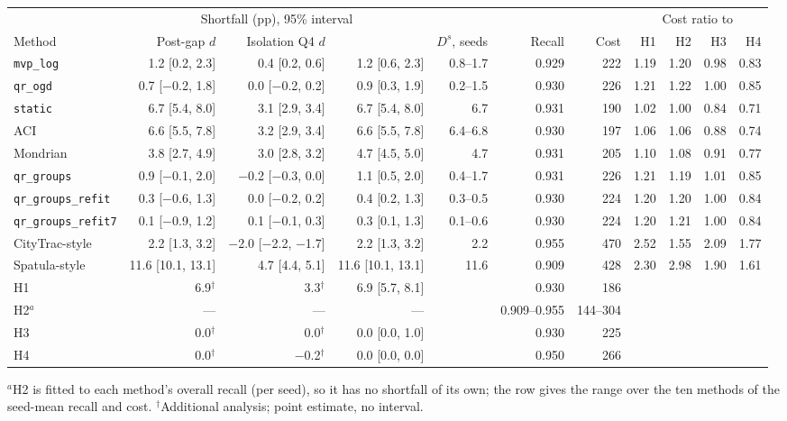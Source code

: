 \begin{tabular}{@{}lrrrrrrrrrr@{}}
\toprule
 & \multicolumn{3}{c}{Shortfall (pp), 95\% interval} & & & & \multicolumn{4}{c}{Cost ratio to} \\
\cmidrule(lr){2-4}\cmidrule(l){8-11}
Method & Post-gap $d$ & Isolation Q4 $d$ & \Dbar{} & $D^s$, seeds & Recall & Cost & H1 & H2 & H3 & H4 \\
\midrule
\texttt{mvp\_log} & 1.2 [0.2, 2.3] & 0.4 [0.2, 0.6] & 1.2 [0.6, 2.3] & 0.8--1.7 & 0.929 & 222 & 1.19 & 1.20 & 0.98 & 0.83 \\
\texttt{qr\_ogd} & 0.7 [$-$0.2, 1.8] & 0.0 [$-$0.2, 0.2] & 0.9 [0.3, 1.9] & 0.2--1.5 & 0.930 & 226 & 1.21 & 1.22 & 1.00 & 0.85 \\
\addlinespace
\texttt{static} & 6.7 [5.4, 8.0] & 3.1 [2.9, 3.4] & 6.7 [5.4, 8.0] & 6.7 & 0.931 & 190 & 1.02 & 1.00 & 0.84 & 0.71 \\
ACI & 6.6 [5.5, 7.8] & 3.2 [2.9, 3.4] & 6.6 [5.5, 7.8] & 6.4--6.8 & 0.930 & 197 & 1.06 & 1.06 & 0.88 & 0.74 \\
Mondrian & 3.8 [2.7, 4.9] & 3.0 [2.8, 3.2] & 4.7 [4.5, 5.0] & 4.7 & 0.931 & 205 & 1.10 & 1.08 & 0.91 & 0.77 \\
\texttt{qr\_groups} & 0.9 [$-$0.1, 2.0] & $-$0.2 [$-$0.3, 0.0] & 1.1 [0.5, 2.0] & 0.4--1.7 & 0.931 & 226 & 1.21 & 1.19 & 1.01 & 0.85 \\
\texttt{qr\_groups\_refit} & 0.3 [$-$0.6, 1.3] & 0.0 [$-$0.2, 0.2] & 0.4 [0.2, 1.3] & 0.3--0.5 & 0.930 & 224 & 1.20 & 1.20 & 1.00 & 0.84 \\
\texttt{qr\_groups\_refit7} & 0.1 [$-$0.9, 1.2] & 0.1 [$-$0.1, 0.3] & 0.3 [0.1, 1.3] & 0.1--0.6 & 0.930 & 224 & 1.20 & 1.21 & 1.00 & 0.84 \\
CityTrac-style & 2.2 [1.3, 3.2] & $-$2.0 [$-$2.2, $-$1.7] & 2.2 [1.3, 3.2] & 2.2 & 0.955 & 470 & 2.52 & 1.55 & 2.09 & 1.77 \\
Spatula-style & 11.6 [10.1, 13.1] & 4.7 [4.4, 5.1] & 11.6 [10.1, 13.1] & 11.6 & 0.909 & 428 & 2.30 & 2.98 & 1.90 & 1.61 \\
\addlinespace
H1 & 6.9$^\dagger$ & 3.3$^\dagger$ & 6.9 [5.7, 8.1] & & 0.930 & 186 &  &  &  & \\
H2$^{a}$ & --- & --- & --- & & 0.909--0.955 & 144--304 &  &  &  & \\
H3 & 0.0$^\dagger$ & 0.0$^\dagger$ & 0.0 [0.0, 1.0] & & 0.930 & 225 &  &  &  & \\
H4 & 0.0$^\dagger$ & $-$0.2$^\dagger$ & 0.0 [0.0, 0.0] & & 0.950 & 266 &  &  &  & \\
\bottomrule
\end{tabular}

\smallskip\parbox{\textwidth}{\footnotesize $^{a}$H2 is fitted to each method's overall recall (per seed), so it has no shortfall of its own; the row gives the range over the ten methods of the seed-mean recall and cost. $^\dagger$Additional analysis; point estimate, no interval.}
